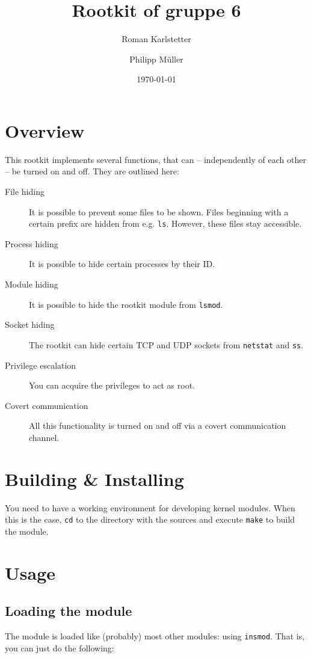 \documentclass[10pt, letterpaper]{article}
\title{Rootkit of gruppe 6}
\author{Roman Karlstetter \and Philipp M\"uller}
\date{\today}
\begin{document}
\maketitle

\section{Overview}

This rootkit implements several functions, that can -- independently of each other -- be turned on and off. They are outlined here:

\begin{description}
\item [File hiding] It is possible to prevent some files to be shown. Files beginning with a certain prefix are hidden from e.g. \texttt{ls}. However, these files stay accessible.
\item [Process hiding] It is possible to hide certain processes by their ID.
\item [Module hiding] It is possible to hide the rootkit module from \texttt{lsmod}.
\item [Socket hiding] The rootkit can hide certain TCP and UDP sockets from \texttt{netstat} and \texttt{ss}.
\item [Privilege escalation] You can acquire the privileges to act as root.
\item [Covert communication] All this functionality is turned on and off via a covert communication channel.
\end{description}

\section{Building \& Installing}
You need to have a working environment for developing kernel modules. When this is the case, \texttt{cd} to the directory with the sources and execute \texttt{make} to build the module. 

\section{Usage}

\subsection{Loading the module}

The module is loaded like (probably) most other modules: using \texttt{insmod}. That is, you can just do the following:
\end{document}
